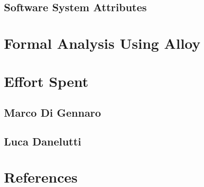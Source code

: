 \documentclass[10pt,openany]{book}
\begin{document}
	\section{Software System Attributes}

		

\chapter{Formal Analysis Using Alloy}\label{chapt:sum}

\chapter{Effort Spent}\label{chapt:sum}

	\section{Marco Di Gennaro}

		

	\section{Luca Danelutti}

		

\chapter{References}\label{chapt:sum}

		

\pagebreak




\end{document}
